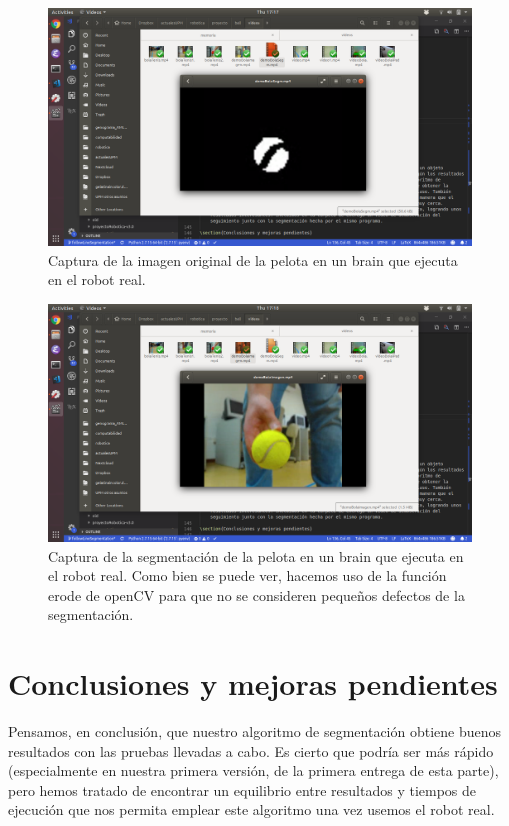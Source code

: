 \documentclass{article}
\begin{document}
	\begin{figure}[H]
	    \centering
	    \includegraphics[width=12cm]{pelota1.png}
	    \caption{Captura de la imagen original de la pelota en un brain que ejecuta en el robot real.}
	    \label{fig:pelota1}
	\end{figure}

	\begin{figure}[H]
	    \centering
	    \includegraphics[width=12cm]{pelota2.png}
	    \caption{Captura de la segmentación de la pelota en un brain que ejecuta en el robot real. Como bien se puede ver, hacemos uso de la función erode de openCV para que no se consideren pequeños defectos de la segmentación.}
	    \label{fig:pelota2}
	\end{figure}

\section{Conclusiones y mejoras pendientes}

	Pensamos, en conclusión, que nuestro algoritmo de segmentación obtiene buenos resultados con las pruebas llevadas a cabo. Es cierto que podría ser más rápido (especialmente en nuestra primera versión, de la primera entrega de esta parte), pero hemos tratado de encontrar un equilibrio entre resultados y tiempos de ejecución que nos permita emplear este algoritmo una vez usemos el robot real.
\end{document}
